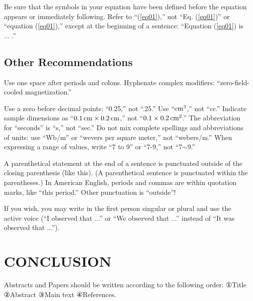 \documentclass{fullpaper_hutech}
\begin{document}
Be sure that the symbols in your equation have been defined before the equation appears or immediately following. Refer to ``(\ref{eq01}),'' not ``Eq. (\ref{eq01})'' or ``equation (\ref{eq01}),'' except at the beginning of a sentence: ``Equation (\ref{eq01}) is ... .''


\subsection{Other Recommendations}

Use one space after periods and colons. Hyphenate complex modifiers: ``zero-field-cooled magnetization.''

Use a zero before decimal points: ``0.25,'' not ``.25.'' Use ``$\rm cm^3$,'' not ``cc.'' Indicate sample dimensions as ``$0.1\,\rm cm\times 0.2\, cm$,'' not ``$0.1\times 0.2\,\rm cm^2$.'' The abbreviation for ``seconds'' is ``s,'' not ``sec.'' Do not mix complete spellings and abbreviations of units: use ``Wb/m'' or ``wevers per square meter,'' not ``webers/m.'' When expressing a range of values, write ``7 to 9'' or ``7-9,'' not ``7$\sim$9.''

A parenthetical statement at the end of a sentence is punctuated outside of the closing parenthesis (like this). (A parenthetical sentence is punctuated within the parentheses.) In American English, periods and commas are within quotation marks, like ``this period.'' Other punctuation is ``outside''!

If you wish, you may write in the first person singular or plural and use the active voice (``I observed that ...'' or ``We observed that ...'' instead of ``It was observed that ...'').

\section{CONCLUSION}

Abstracts and Papers should be written according to the following order: ①Title ②Abstract ③Main text ④References.

\end{document}
